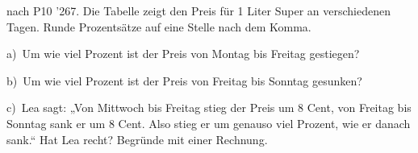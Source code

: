 \documentclass[11pt]{article}
\begin{document}
\begin{pfaufg}{nach P10 ’26}{7.}{}
Die Tabelle zeigt den Preis für 1 Liter Super an verschiedenen Tagen. Runde Prozentsätze auf eine Stelle nach dem Komma.\par\medskip{}\par\smallskip
\noindent\begin{minipage}[t]{0.48\linewidth}
a)\ Um wie viel Prozent ist der Preis von Montag bis Freitag gestiegen?
\end{minipage}\hfill
\begin{minipage}[t]{0.48\linewidth}
b)\ Um wie viel Prozent ist der Preis von Freitag bis Sonntag gesunken?
\end{minipage}
\noindent\begin{minipage}[t]{0.48\linewidth}
c)\ Lea sagt: „Von Mittwoch bis Freitag stieg der Preis um $8$ Cent, von Freitag bis Sonntag sank er um $8$ Cent. Also stieg er um genauso viel Prozent, wie er danach sank.“ Hat Lea recht? Begründe mit einer Rechnung.
\end{minipage}
\end{pfaufg}

\par\vfill{}
\end{document}
